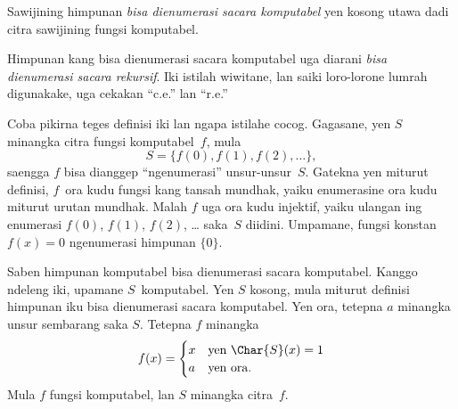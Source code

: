 \documentclass[../../../include/open-logic-section]{subfiles}
\begin{document}

\begin{defn}
Sawijining himpunan \emph{bisa dienumerasi sacara
  komputabel} yen kosong utawa dadi citra
sawijining fungsi komputabel.
\end{defn}

\begin{history}
Himpunan kang bisa dienumerasi sacara komputabel
uga diarani \emph{bisa dienumerasi sacara
  rekursif}. Iki istilah wiwitane, lan saiki
loro-lorone lumrah digunakake, uga cekakan
``c.e.'' lan ``r.e.''
\end{history}

\begin{explain}
Coba pikirna teges definisi iki lan ngapa
istilahe cocog. Gagasane, yen $S$ minangka
citra fungsi komputabel~$f$, mula
\[
S = \{ f(0), f(1), f(2), \dots \},
\]
saengga $f$ bisa dianggep ``ngenumerasi''
unsur-unsur~$S$. Gatekna yen miturut definisi,
$f$~ora kudu fungsi kang tansah mundhak,
yaiku enumerasine ora kudu miturut urutan
mundhak. Malah $f$ uga ora kudu injektif,
yaiku ulangan ing enumerasi $f(0)$,
$f(1)$, $f(2)$, \dots{} saka~$S$ diidini.
Umpamane, fungsi konstan $f(x) = 0$
ngenumerasi himpunan $\{ 0
\}$.
\end{explain}

Saben himpunan komputabel bisa dienumerasi
sacara komputabel. Kanggo ndeleng iki,
upamane $S$~komputabel. Yen $S$ kosong,
mula miturut definisi himpunan iku bisa
dienumerasi sacara komputabel. Yen ora,
tetepna $a$ minangka unsur sembarang saka
$S$. Tetepna $f$ minangka
\[
f(x) =
\begin{cases}
x & \text{yen $\Char{S}(x) = 1$} \\
a & \text{yen ora.}
\end{cases}
\]
Mula $f$ fungsi komputabel, lan $S$
minangka citra~$f$.
\end{document}
